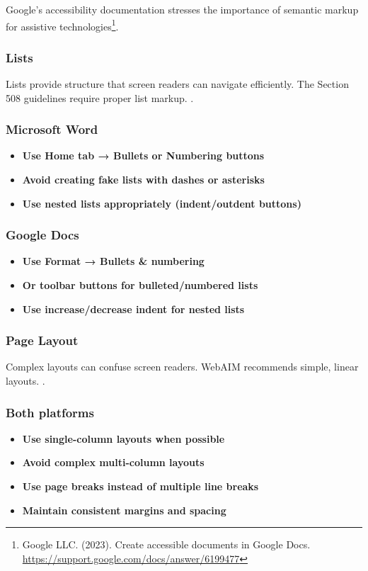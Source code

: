 Google's accessibility documentation stresses the importance of semantic markup for assistive technologies\footnote{Google LLC. (2023). Create accessible documents in Google Docs. \url{https://support.google.com/docs/answer/6199477}}.

\subsubsection{Lists}
Lists provide structure that screen readers can navigate efficiently. The Section 508 guidelines require proper list markup.
 \cite{Section5082018}.

\subsubsection{Microsoft Word}
\vspace{1em}
\begin{itemize}
\item \textbf{Use Home tab → Bullets or Numbering buttons}
\item \textbf{Avoid creating fake lists with dashes or asterisks}
\item \textbf{Use nested lists appropriately (indent/outdent buttons)}
\end{itemize}
\vspace{1em}

\subsubsection{Google Docs}
\vspace{1em}
\begin{itemize}
\item \textbf{Use Format → Bullets \& numbering}
\item \textbf{Or toolbar buttons for bulleted/numbered lists}
\item \textbf{Use increase/decrease indent for nested lists}
\end{itemize}
\vspace{1em}

\subsubsection{Page Layout}
Complex layouts can confuse screen readers. WebAIM recommends simple, linear layouts.
 \cite{WebAIM2023}.

\subsubsection{Both platforms}
\vspace{1em}
\begin{itemize}
\item \textbf{Use single-column layouts when possible}
\item \textbf{Avoid complex multi-column layouts}
\item \textbf{Use page breaks instead of multiple line breaks}
\item \textbf{Maintain consistent margins and spacing}
\end{itemize}
\vspace{1em}

